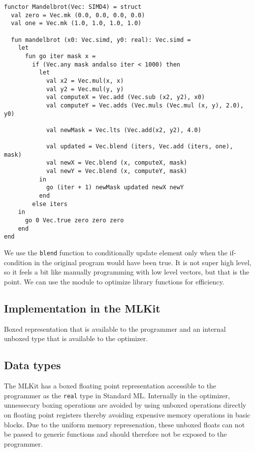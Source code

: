 \documentclass{article}
\begin{document}
\begin{lstlisting}
functor Mandelbrot(Vec: SIMD4) = struct
  val zero = Vec.mk (0.0, 0.0, 0.0, 0.0)
  val one = Vec.mk (1.0, 1.0, 1.0, 1.0)

  fun mandelbrot (x0: Vec.simd, y0: real): Vec.simd =
    let
      fun go iter mask x =
        if (Vec.any mask andalso iter < 1000) then
          let
            val x2 = Vec.mul(x, x)
            val y2 = Vec.mul(y, y)
            val computeX = Vec.add (Vec.sub (x2, y2), x0)
            val computeY = Vec.adds (Vec.muls (Vec.mul (x, y), 2.0), y0)

            val newMask = Vec.lts (Vec.add(x2, y2), 4.0)

            val updated = Vec.blend (iters, Vec.add (iters, one), mask)
            val newX = Vec.blend (x, computeX, mask)
            val newY = Vec.blend (x, computeY, mask)
          in
            go (iter + 1) newMask updated newX newY
          end
        else iters
    in
      go 0 Vec.true zero zero zero
    end
end
\end{lstlisting}

We use the \verb!blend! function to conditionally update element only when the if-condition in the original program would have been true. It is not super high level, so it feels a bit like manually programming with low level vectors, but that is the point. We can use the module to optimize library functions for efficiency.

\subsection{Implementation in the MLKit}

Boxed representation that is available to the programmer and an internal unboxed type that is available to the optimizer.

\subsection{Data types}

The MLKit has a boxed floating point representation accessible to the programmer as the \verb!real! type in Standard ML. Internally in the optimizer, unnessecary boxing operations are avoided by using unboxed operations directly on floating point registers thereby avoiding expensive memory operations in basic blocks. Due to the uniform memory represenation, these unboxed floats can not be passed to generic functions and should therefore not be exposed to the programmer.
\end{document}
